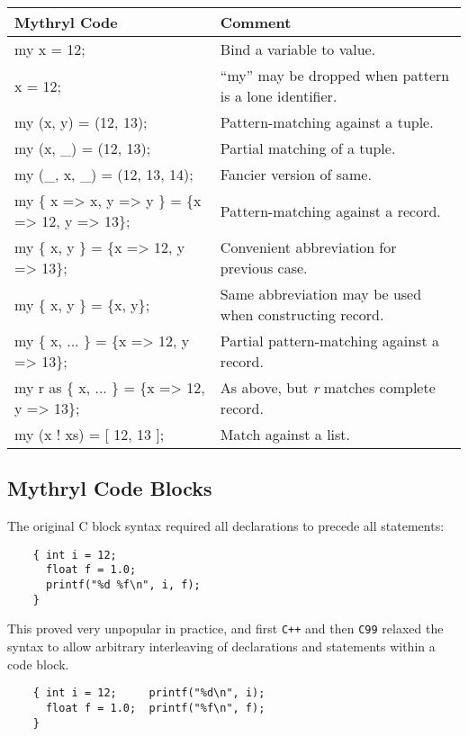 \begin{tabular}{|l|l|} \hline
{\bf Mythryl Code} & {\bf Comment} \\ \hline \hline
my x = 12; & Bind a variable to value. \\ \hline
x = 12; & ``my'' may be dropped when pattern is a lone identifier. \\ \hline
my (x, y) = (12, 13); & Pattern-matching against a tuple. \\ \hline
my (x, \_) = (12, 13); & Partial matching of a tuple. \\ \hline
my (\_, x, \_) = (12, 13, 14); & Fancier version of same. \\ \hline
my \{ x => x, y => y \} = \{x => 12, y => 13\}; & Pattern-matching against a record. \\ \hline
my \{ x, y \} = \{x => 12, y => 13\}; & Convenient abbreviation for previous case. \\ \hline
my \{ x, y \} = \{x, y\}; & Same abbreviation may be used when constructing record. \\ \hline
my \{ x, ... \} = \{x => 12, y => 13\}; & Partial pattern-matching against a record. \\ \hline
my r as \{ x, ... \} = \{x => 12, y => 13\}; & As above, but {\it r} matches complete record. \\ \hline
my (x ! xs) = [ 12, 13 ]; & Match against a list. \\ \hline
\end{tabular}

\cutend*

\subsection{Mythryl Code Blocks}

The original C block syntax required all declarations to precede all statements:
\begin{verbatim}
    { int i = 12;
      float f = 1.0;
      printf("%d %f\n", i, f);
    }
\end{verbatim}

This proved very unpopular in practice, and first {\tt C++} and then {\tt C99} relaxed 
the syntax to allow arbitrary interleaving of declarations and statements within a code 
block.

\begin{verbatim}
    { int i = 12;     printf("%d\n", i);
      float f = 1.0;  printf("%f\n", f);
    }
\end{verbatim}

